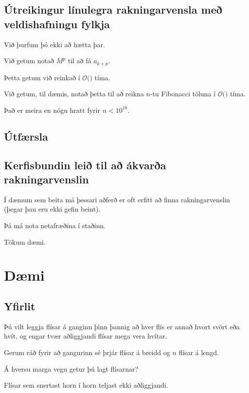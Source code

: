 \subsection{Útreikingur línulegra rakningarvensla með veldishafningu fylkja}
{
    {
        \item<1-> Við þurfum þó ekki að hætta þar.
        \item<2-> Við getum notað $M^p$ til að fá $a_{k + p}$.
        \item<3-> Þetta getum við reinkað í $\mathcal{O}($$)$ tíma.
        \item<5-> Við getum, til dæmis, notað þetta til að reikna $n$-tu Fibonacci töluna í $\mathcal{O}($$)$ tíma.
        \item<7-> Það er meira en nógu hratt fyrir $n < 10^{18}$.
    }
}

\subsection{Útfærsla}
{
}

\subsection{Kerfisbundin leið til að ákvarða rakningarvenslin}
{
    {
        \item<1-> Í dæmum sem beita má þessari aðferð er oft erfitt að finna rakningarvenslin (þegar þau eru ekki gefin beint).
        \item<2-> Þá má nota netafræðina í staðinn.
        \item<3-> Tökum dæmi.
    }
}

\section{Dæmi}
\subsection{Yfirlit}
{
    {
        \item<1-> Þú vilt leggja flísar á ganginn þinn þannig að hver flís er annað hvort svört eða hvít,
                    og engar tvær aðliggjandi flísar mega vera hvítar.
        \item<2-> Gerum ráð fyrir að gangurinn sé þrjár flísar á breidd og $n$ flísar á lengd.
        \item<3-> Á hversu marga vegu getur þú lagt flísarnar?
        \item<4-> Flísar sem snertast horn í horn teljast ekki aðliggjandi.
    }
}

